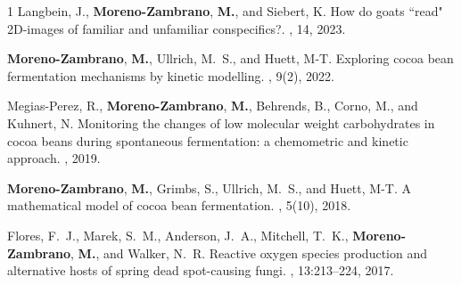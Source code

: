 \documentclass[11pt,a4paper,sans]{moderncv}        %
\makeatletter
\renewcommand*{\bibliographyitemlabel}{\@biblabel{\arabic{enumiv}}}
\makeatother
\begin{document}
%
\vspace{-0.3cm}
\begin{thebibliography}{1}
	Langbein, J., \textbf{Moreno-Zambrano}, \textbf{M.},  and Siebert, K.
	\newblock How do goats ``read" 2D-images of familiar and unfamiliar conspecifics?.
	, 14, 2023. 


	\textbf{Moreno-Zambrano}, \textbf{M.}, Ullrich, M.~S., and
	Huett, M-T.
	\newblock Exploring cocoa bean fermentation mechanisms by kinetic modelling.
	, 9(2), 2022. 


	Megias-Perez, R., \textbf{Moreno-Zambrano}, \textbf{M.}, Behrends, B., Corno, M.,
	and Kuhnert, N.
	\newblock Monitoring the changes of low molecular weight carbohydrates in cocoa
	beans during spontaneous fermentation: a chemometric and kinetic approach.
	, 2019.

	\textbf{Moreno-Zambrano}, \textbf{M.}, Grimbs, S., Ullrich, M.~S., and
	Huett, M-T.
	\newblock A mathematical model of cocoa bean fermentation.
	, 5(10), 2018.

	Flores, F.~J., Marek, S.~M., Anderson, J.~A., Mitchell, T.~K., \textbf{Moreno-Zambrano}, \textbf{M.}, and Walker, N.~R.
	\newblock Reactive oxygen species production and alternative hosts of spring
	dead spot-causing fungi.
	, 13:213--224, 2017.



\end{thebibliography}
\end{document}
